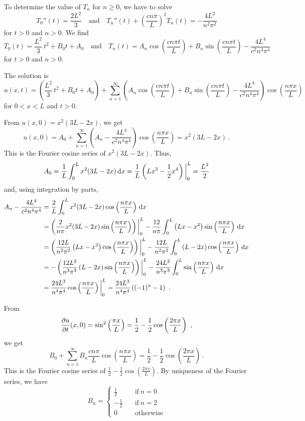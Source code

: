 \begin{egg}
To determine the value of $T_n$ for $n\geq 0$, we have to solve
\[
T_0''(t) = \frac{2L^2}{3} \quad \text{and} \quad
T_n''(t) + \left(\frac{c n\pi}{L}\right)^2 T_n(t) = -\frac{4L^2}{n^2\pi^2}
\]
for $t>0$ and $n>0$.  We find
\[
T_0(t) = \frac{L^2}{3}\,t^2 + B_0t + A_0 \quad \text{and} \quad
T_n(t) = A_n\cos\left(\frac{c n \pi t}{L}\right)
+ B_n \sin\left(\frac{c n \pi t}{L}\right) -
\frac{4 L^4}{c^2n^4\pi^4}
\]
for $t>0$ and $n>0$.

The solution is
\[
u(x,t) = \left(\frac{L^2}{3}\,t^2 + B_0t + A_0\right)
+ \sum_{n=1}^\infty 
\left( A_n\cos\left(\frac{c n \pi t}{L}\right)
+ B_n \sin\left(\frac{c n \pi t}{L}\right) -
\frac{4 L^4}{c^2n^4\pi^4} \right)\cos\left(\frac{n\pi x}{L}\right)
\]
for $0<x<L$ and $t>0$.

From $\displaystyle u(x,0) = x^2(3L-2x)$, we get
\[
u(x,0) = A_0
+ \sum_{n=1}^\infty 
\left( A_n - \frac{4 L^4}{c^2n^4\pi^4} \right)\cos\left(\frac{n\pi x}{L}\right)
= x^2(3L-2x) \ .
\]
This is the Fourier cosine series of $\displaystyle x^2(3L-2x)$.  Thus,
\[
A_0 = \frac{1}{L}\int_0^L x^2(3L-2x) \,\mathrm{d}{x} =
\frac{1}{L}\left( Lx^3 - \frac{1}{2} x^4\right)\bigg|_0^L
= \frac{L^3}{2}
\]
and, using integration by parts,
\begin{align*}
A_n - \frac{4 L^4}{c^2n^4\pi^4} &= \frac{2}{L}\int_0^L x^2(3L-2x)
\cos\left(\frac{n\pi x}{L}\right) \,\mathrm{d}{x} \\
&= \left(\frac{2}{n\pi} x^2(3L-2x)
\sin\left(\frac{n\pi x}{L}\right)\right)\bigg|_0^L
- \frac{12}{n\pi} \int_0^L \left(Lx-x^2\right)
\sin\left(\frac{n\pi x}{L}\right)\,\mathrm{d}{x} \\
&= \left( \frac{12L}{n^2\pi^2} \left(Lx-x^2\right)
\cos\left(\frac{n\pi x}{L}\right)\right)\bigg|_0^L
- \frac{12L}{n^2\pi^2} \int_0^L \left(L-2x\right)
\cos\left(\frac{n\pi x}{L}\right) \,\mathrm{d}{x} \\
&= - \left( \frac{12L^2}{n^3\pi^3} \left(L-2x\right)
\sin\left(\frac{n\pi x}{L}\right) \right)\bigg|_0^L
- \frac{24L^2}{n^3\pi^3} \int_0^L
\sin\left(\frac{n\pi x}{L}\right) \,\mathrm{d}{x} \\
&= \frac{24L^3}{n^4\pi^4}
\cos\left(\frac{n\pi x}{L}\right)\bigg|_0^L 
= \frac{24L^3}{n^4\pi^4} \left( (-1)^n -1 \right) \ .
\end{align*}

From
\[
\pdydx{u}{t}(x,0) = \sin^2\left(\frac{\pi x}{L}\right)
= \frac{1}{2} - \frac{1}{2}\cos\left(\frac{2 \pi x}{L}\right) \ ,
\]
we get
\[
B_0
+ \sum_{n=1}^\infty B_n\frac{cn\pi}{L}\cos\left(\frac{n\pi x}{L}\right)
= \frac{1}{2} - \frac{1}{2}\cos\left(\frac{2 \pi x}{L}\right) \ .
\]
This is the Fourier cosine series of $\displaystyle
\frac{1}{2} - \frac{1}{2}\cos\left(\frac{2 \pi x}{L}\right)$.  By
uniqueness of the Fourier series, we have
\[
B_n =
\begin{cases}
\displaystyle \frac{1}{2} & \quad \text{if} \ n=0 \\[0.7em]
\displaystyle -\frac{1}{2} & \quad \text{if} \ n=2 \\[0.7em]
0 & \quad \text{otherwise}
\end{cases}
\]


\end{egg}
